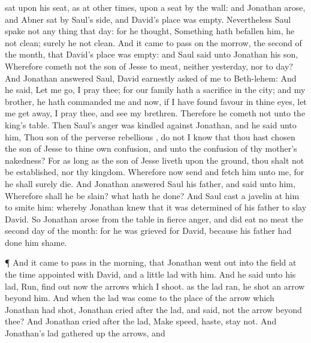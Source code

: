 {sat upon his
seat, as at other
times,
{} upon a
seat by the
wall: and
Jonathan
arose, and
Abner
sat by
Saul’s
side, and
David’s
place was
empty.
Nevertheless
Saul
spake not any
thing that
day: for he
thought, Something hath
befallen him, he
{}
not
clean; surely he
{} not
clean.
And it came to pass on the
morrow,
{} the
second
{} of the
month, that
David’s
place was
empty: and
Saul
said unto
Jonathan his
son, Wherefore
cometh not the
son of
Jesse to
meat, neither
yesterday, nor to
day?
And
Jonathan
answered
Saul,
David
earnestly
asked
{} of
me
{} to
Beth-lehem:
And he
said, Let me
go, I pray thee; for our
family hath a
sacrifice in the
city; and my
brother, he hath
commanded me
{} and now, if I have
found
favour in thine
eyes, let me get
away, I pray thee, and
see my
brethren. Therefore he
cometh not unto the
king’s
table.
Then
Saul’s
anger was
kindled against
Jonathan, and he
said unto him, Thou
son of the
perverse
rebellious
{}, do not I
know that thou hast
chosen the
son of
Jesse to thine own
confusion, and unto the
confusion of thy
mother’s
nakedness?
For as long
as the
son of
Jesse
liveth upon the
ground, thou shalt not be
established, nor thy
kingdom. Wherefore now
send and
fetch him unto me, for he shall surely
die.
And
Jonathan
answered
Saul his
father, and
said unto him, Wherefore shall he be
slain? what hath he
done?
And
Saul
cast a
javelin at him to
smite him: whereby
Jonathan
knew that it was
determined of his
father to
slay
David.
So
Jonathan
arose from the
table in
fierce
anger, and did
eat no
meat the
second
day of the
month: for he was
grieved for
David, because his
father had done him
shame.
\par }{\PP {}¶ And it came to pass in the
morning, that
Jonathan went
out into the
field at the time
appointed with
David, and a
little
lad with him.
And he
said unto his
lad,
Run, find
out now the
arrows which I
shoot.
{} as the
lad
ran, he
shot an
arrow
beyond him.
And when the
lad was
come to the
place of the
arrow which
Jonathan had
shot,
Jonathan
cried
after the
lad, and
said,
{} not the
arrow
beyond thee?
And
Jonathan
cried
after the
lad, Make
speed,
haste,
stay not. And
Jonathan’s
lad gathered
up the
arrows, and
}
